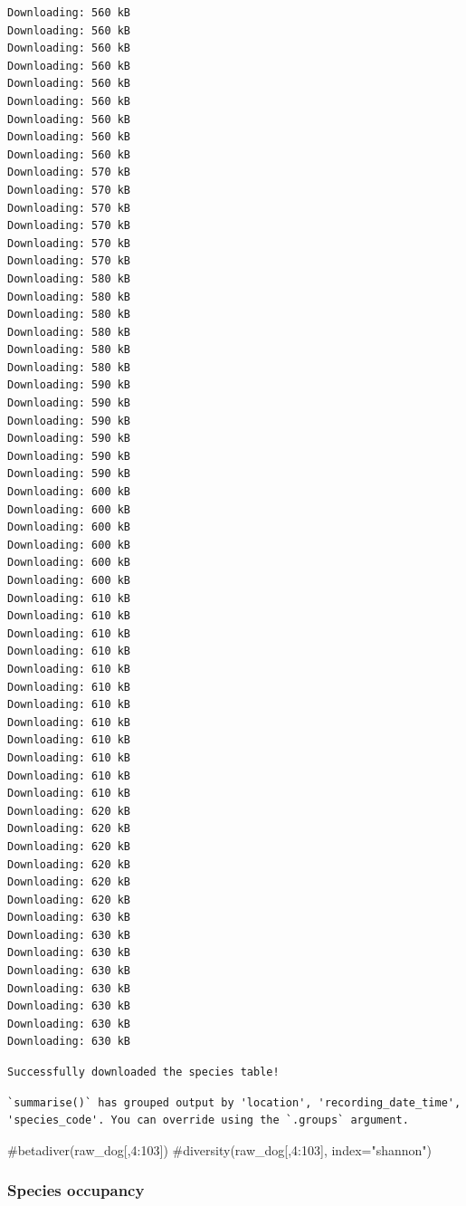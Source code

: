 \documentclass[
  letterpaper,
  DIV=11,
  numbers=noendperiod,
  oneside]{scrartcl}
\newenvironment{Shaded}{\begin{snugshade}}{\end{snugshade}}
\newcommand{\CommentTok}[1]{\textcolor[rgb]{0.37,0.37,0.37}{#1}}
\begin{document}
\begin{verbatim}
Downloading: 560 kB     
Downloading: 560 kB     
Downloading: 560 kB     
Downloading: 560 kB     
Downloading: 560 kB     
Downloading: 560 kB     
Downloading: 560 kB     
Downloading: 560 kB     
Downloading: 560 kB     
Downloading: 570 kB     
Downloading: 570 kB     
Downloading: 570 kB     
Downloading: 570 kB     
Downloading: 570 kB     
Downloading: 570 kB     
Downloading: 580 kB     
Downloading: 580 kB     
Downloading: 580 kB     
Downloading: 580 kB     
Downloading: 580 kB     
Downloading: 580 kB     
Downloading: 590 kB     
Downloading: 590 kB     
Downloading: 590 kB     
Downloading: 590 kB     
Downloading: 590 kB     
Downloading: 590 kB     
Downloading: 600 kB     
Downloading: 600 kB     
Downloading: 600 kB     
Downloading: 600 kB     
Downloading: 600 kB     
Downloading: 600 kB     
Downloading: 610 kB     
Downloading: 610 kB     
Downloading: 610 kB     
Downloading: 610 kB     
Downloading: 610 kB     
Downloading: 610 kB     
Downloading: 610 kB     
Downloading: 610 kB     
Downloading: 610 kB     
Downloading: 610 kB     
Downloading: 610 kB     
Downloading: 610 kB     
Downloading: 620 kB     
Downloading: 620 kB     
Downloading: 620 kB     
Downloading: 620 kB     
Downloading: 620 kB     
Downloading: 620 kB     
Downloading: 630 kB     
Downloading: 630 kB     
Downloading: 630 kB     
Downloading: 630 kB     
Downloading: 630 kB     
Downloading: 630 kB     
Downloading: 630 kB     
Downloading: 630 kB     
\end{verbatim}

\begin{verbatim}
Successfully downloaded the species table!
\end{verbatim}

\begin{verbatim}
`summarise()` has grouped output by 'location', 'recording_date_time',
'species_code'. You can override using the `.groups` argument.
\end{verbatim}

\begin{Shaded}
\begin{Highlighting}[]
\CommentTok{\#betadiver(raw\_dog[,4:103])}
\CommentTok{\#diversity(raw\_dog[,4:103], index="shannon")}
\end{Highlighting}
\end{Shaded}

\hypertarget{species-occupancy}{%
\subsubsection{Species occupancy}\label{species-occupancy}}
\end{document}
